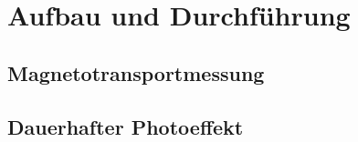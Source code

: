 \section{Aufbau und Durchführung}

\subsection{Magnetotransportmessung}

\subsection{Dauerhafter Photoeffekt}
